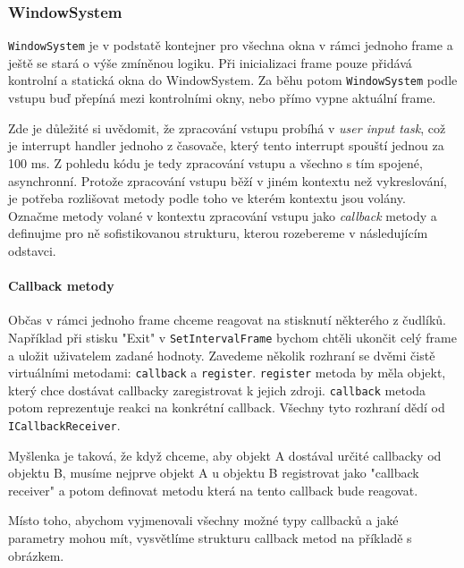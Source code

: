 \subsubsection{WindowSystem}
\texttt{WindowSystem} je v podstatě kontejner pro všechna okna v rámci jednoho frame a ještě se stará
o výše zmíněnou logiku.
Při inicializaci frame pouze přidává kontrolní a statická okna do WindowSystem.
Za běhu potom \texttt{WindowSystem} podle vstupu buď přepíná mezi kontrolními okny, nebo přímo vypne
aktuální frame.

Zde je důležité si uvědomit, že zpracování vstupu probíhá v \emph{user input task}, což je interrupt
handler jednoho z časovače, který tento interrupt spouští jednou za 100 ms.
Z pohledu kódu je tedy zpracování vstupu a všechno s tím spojené, asynchronní.
Protože zpracování vstupu běží v jiném kontextu než vykreslování, je potřeba rozlišovat metody podle
toho ve kterém kontextu jsou volány.
Označme metody volané v kontextu zpracování vstupu jako \emph{callback} metody a definujme pro
ně sofistikovanou strukturu, kterou rozebereme v následujícím odstavci.

\paragraph{Callback metody}
Občas v rámci jednoho frame chceme reagovat na stisknutí některého z čudlíků.
Například při stisku "Exit" v \texttt{SetIntervalFrame} bychom chtěli ukončit celý frame a uložit
uživatelem zadané hodnoty.
Zavedeme několik rozhraní se dvěmi čistě virtuálními metodami: \texttt{callback} a \texttt{register}.
\texttt{register} metoda by měla objekt, který chce dostávat callbacky zaregistrovat k jejich zdroji.
\texttt{callback} metoda potom reprezentuje reakci na konkrétní callback.
Všechny tyto rozhraní dědí od \texttt{ICallbackReceiver}.

Myšlenka je taková, že když chceme, aby objekt A dostával určité callbacky od objektu B,
musíme nejprve objekt A u objektu B registrovat jako "callback receiver" a potom definovat
metodu která na tento callback bude reagovat.

Místo toho, abychom vyjmenovali všechny možné typy callbacků a jaké parametry mohou mít, vysvětlíme
strukturu callback metod na příkladě s obrázkem.

